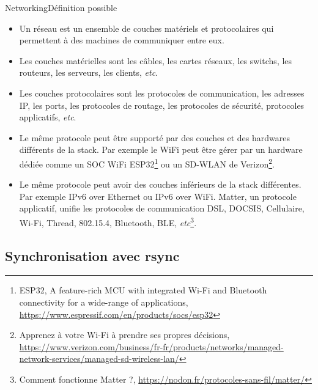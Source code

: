 \documentclass{beamer}
\begin{document}
    \begin{frame}{Networking}{Définition possible}
        \begin{scriptsize}
            \begin{itemize}
                \item Un réseau est un ensemble de couches matériels et protocolaires qui permettent à des machines de communiquer entre eux.
                \item Les couches matérielles sont les câbles, les cartes réseaux, les switchs, les routeurs, les serveurs, les clients, \textit{etc}.
                \item Les couches protocolaires sont les protocoles de communication, les adresses IP, les ports, les protocoles de routage, les protocoles de sécurité, protocoles applicatifs, \textit{etc}.
                \item Le même protocole peut être supporté par des couches et des hardwares différents de la stack.
                Par exemple le WiFi peut être gérer par un hardware dédiée comme un SOC WiFi ESP32\footnote{ESP32, A feature-rich MCU with integrated Wi-Fi and Bluetooth connectivity for a wide-range of applications, \url{https://www.espressif.com/en/products/socs/esp32}} ou un SD-WLAN de Verizon\footnote{Apprenez à votre Wi-Fi à prendre ses propres décisions, \url{https://www.verizon.com/business/fr-fr/products/networks/managed-network-services/managed-sd-wireless-lan/}}.
                \item Le même protocole peut avoir des couches inférieurs de la stack différentes.
                Par exemple IPv6 over Ethernet ou IPv6 over WiFi.
                Matter, un protocole applicatif, unifie les protocoles de communication DSL, DOCSIS, Cellulaire, Wi-Fi, Thread, 802.15.4, Bluetooth, BLE, \textit{etc}\footnote{Comment fonctionne Matter ?, \url{https://nodon.fr/protocoles-sans-fil/matter/}}.
            \end{itemize}
        \end{scriptsize}
    \end{frame}

    \subsection{Synchronisation avec rsync}\label{subsec:rsync-syncro}
\end{document}
